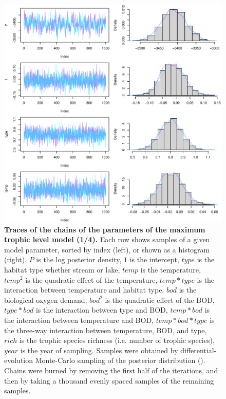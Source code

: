 \documentclass[11pt, oneside]{article}
\begin{document}
\begin{figure}[H]
\begin{center}
\includegraphics[page=1, width=1\linewidth]{b0_6_2/out_mTL/fig_tracePlot_beta.pdf}
\caption{
    \textbf{Traces of the chains of the parameters of the maximum trophic level model (1/4).}
    Each row shows samples of a given model parameter, sorted by index (left), or shown as a histogram (right).
    $P$ is the log posterior density, $1$ is the intercept, $type$ is the habitat type whether stream or lake, $temp$ is the temperature, $temp^2$ is the quadratic effect of the temperature, $temp * type$ is the interaction between temperature and habitat type, $bod$ is the biological oxygen demand, $bod^2$ is the quadratic effect of the BOD, $type * bod$ is the interaction between type and BOD, $temp * bod$ is the interaction between temperature and BOD, $temp * bod * type$ is the three-way interaction between temperature, BOD, and type, $rich$ is the trophic species richness (i.e. number of trophic species), $year$ is the year of sampling.
    Samples were obtained by differential-evolution Monte-Carlo sampling of the posterior distribution (\cite{TerBraak2006}).
    Chains were burned by removing the first half of the iterations, and then by taking a thousand evenly spaced samples of the remaining samples.
} 
\end{center}
\end{figure}
\end{document}
